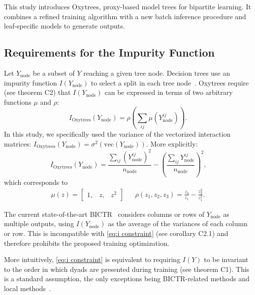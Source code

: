 \documentclass[letterpaper]{article}
\begin{document}
This study introduces Oxytrees, proxy-based model trees for bipartite learning. It combines a refined training algorithm with a new batch inference procedure and leaf-specific models to generate outputs.


\subsection{Requirements for the Impurity Function}
\label{sec:oxytrees impurity}

Let $Y_\text{node}$ be a subset of
$Y$ reaching a given tree node.
Decision trees use an impurity function $I(Y_\text{node})$ to select a split in each tree node~\cite{breiman_classification_1984,blockeel1998top}.
Oxytrees require (see theorem C2) that $I(Y_\text{node})$ can be expressed in terms of two arbitrary functions $\mu$ and $\rho$:
\begin{equation}
    \label{eq:i constraint}
    \textstyle
    I_\text{Oxytrees} (Y_\text{node}) = \rho(\sum_{ij}\mu(Y_\text{node}^{ij}))
    \text{.}
\end{equation}
In this study, we specifically used the variance of the vectorized interaction matrices: $I_\text{Oxytrees} (Y_\text{node}) = \sigma^2(\text{vec}(Y_\text{node}))$. More explicitly:
\begin{equation}
    \label{eq:i bgso}
    I_\text{Oxytrees} (Y_\text{node})
    = \frac{\sum_{ij}(Y^{ij}_\text{node})^2}{n_\text{node}} - \left(\frac{\sum_{ij}Y^{ij}_\text{node}}{n_\text{node}}\right)^2
    \text{,}
\end{equation}
which corresponds to
\begin{align}
    \mu(z) = \begin{bmatrix} 1, & z, & z^2 \end{bmatrix}
    &&
    \rho(z_1, z_2, z_3) = \frac{z_3}{z_1} - \frac{z_2^2}{z_1^2}
    \text{.}
\end{align}

The current state-of-the-art BICTR~\cite{pliakos_drug-target_2020} considers columns or rows of $Y_\text{node}$ as multiple outputs, using $I(Y_\text{node})$ as the average of the variances of each column or row. This is incompatible with \cref{eq:i constraint} (see corollary C2.1) and therefore prohibits the proposed training optimization.

More intuitively, \cref{eq:i constraint} is equivalent to requiring $I(Y)$ to be invariant to the order in which dyads are presented during training (see theorem C1).
This is a standard assumption, the only exceptions being BICTR-related methods and local methods~\cite{schrynemackers_protocols_2013}.
\end{document}
